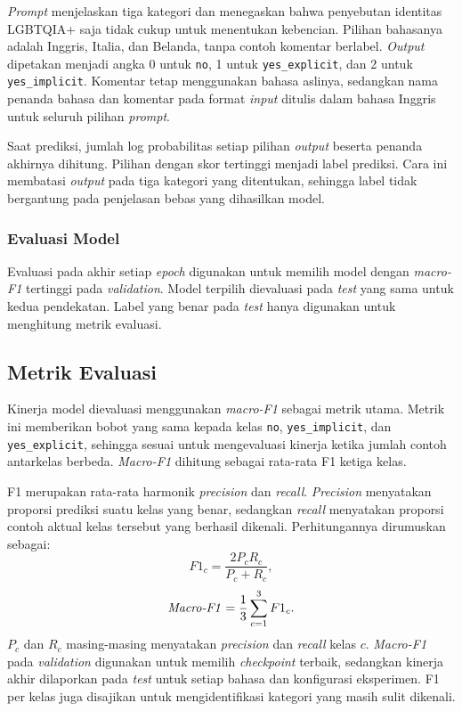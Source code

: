 \documentclass[11pt]{article}
\begin{document}
\textit{Prompt} menjelaskan tiga kategori dan menegaskan bahwa penyebutan identitas LGBTQIA+ saja tidak cukup untuk menentukan kebencian. Pilihan bahasanya adalah Inggris, Italia, dan Belanda, tanpa contoh komentar berlabel. \textit{Output} dipetakan menjadi angka 0 untuk \texttt{no}, 1 untuk \texttt{yes\_explicit}, dan 2 untuk \texttt{yes\_implicit}. Komentar tetap menggunakan bahasa aslinya, sedangkan nama penanda bahasa dan komentar pada format \textit{input} ditulis dalam bahasa Inggris untuk seluruh pilihan \textit{prompt}.

Saat prediksi, jumlah log probabilitas setiap pilihan \textit{output} beserta penanda akhirnya dihitung. Pilihan dengan skor tertinggi menjadi label prediksi. Cara ini membatasi \textit{output} pada tiga kategori yang ditentukan, sehingga label tidak bergantung pada penjelasan bebas yang dihasilkan model.

\subsubsection{Evaluasi Model}
Evaluasi pada akhir setiap \textit{epoch} digunakan untuk memilih model dengan \textit{macro-F1} tertinggi pada \textit{validation}. Model terpilih dievaluasi pada \textit{test} yang sama untuk kedua pendekatan. Label yang benar pada \textit{test} hanya digunakan untuk menghitung metrik evaluasi.

\subsection{Metrik Evaluasi}
Kinerja model dievaluasi menggunakan \textit{macro-F1} sebagai metrik utama. Metrik ini memberikan bobot yang sama kepada kelas \texttt{no}, \texttt{yes\_implicit}, dan \texttt{yes\_explicit}, sehingga sesuai untuk mengevaluasi kinerja ketika jumlah contoh antarkelas berbeda. \textit{Macro-F1} dihitung sebagai rata-rata F1 ketiga kelas.

F1 merupakan rata-rata harmonik \textit{precision} dan \textit{recall}. \textit{Precision} menyatakan proporsi prediksi suatu kelas yang benar, sedangkan \textit{recall} menyatakan proporsi contoh aktual kelas tersebut yang berhasil dikenali. Perhitungannya dirumuskan sebagai:
\begin{equation}
F1_c = \frac{2P_cR_c}{P_c+R_c},
\end{equation}
\begin{equation}
\text{\textit{Macro-F1}} = \frac{1}{3}\sum_{c=1}^{3}F1_c.
\end{equation}
$P_c$ dan $R_c$ masing-masing menyatakan \textit{precision} dan \textit{recall} kelas $c$. \textit{Macro-F1} pada \textit{validation} digunakan untuk memilih \textit{checkpoint} terbaik, sedangkan kinerja akhir dilaporkan pada \textit{test} untuk setiap bahasa dan konfigurasi eksperimen. F1 per kelas juga disajikan untuk mengidentifikasi kategori yang masih sulit dikenali.
\end{document}
